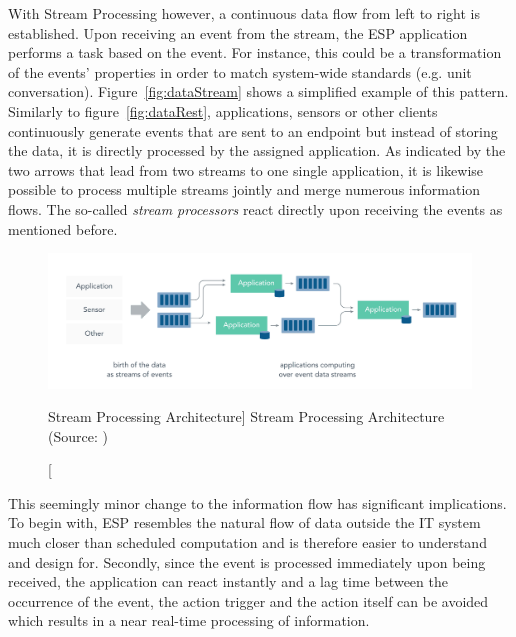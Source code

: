 \begin{enumerate}
    With Stream Processing however, a continuous data flow from left to right is established. Upon receiving an event from the stream, the \acf{ESP} application performs a task based on the event. For instance, this could be a transformation of the events' properties in order to match system-wide standards (e.g. unit conversation). 
    Figure~\vref{fig:dataStream} shows a simplified example of this pattern. Similarly to figure~\vref{fig:dataRest}, applications, sensors or other clients continuously generate events that are sent to an endpoint but instead of storing the data, it is directly processed by the assigned application. As indicated by the two arrows that lead from two streams to one single application, it is likewise possible to process multiple streams jointly and merge numerous information flows. The so-called \textit{stream processors} react directly upon receiving the events as mentioned before. 
    
    \begin{figure}[ht]
        \includegraphics[width=\linewidth]{images/streaming/streming_data.png}\centering
        \caption
        [Stream Processing Architecture]
        {Stream Processing Architecture (Source: \cite{dataArtisans2017WhatProcessing})}
        \label{fig:dataStream}
    \end{figure}
    
    This seemingly minor change to the information flow has significant implications. To begin with, \acf{ESP} resembles the natural flow of data outside the IT system much closer than scheduled computation and is therefore easier to understand and design for. Secondly, since the event is processed immediately upon being received, the application can react instantly and a lag time between the occurrence of the event, the action trigger and the action itself can be avoided which results in a near real-time processing of information. 
    

\end{enumerate}
